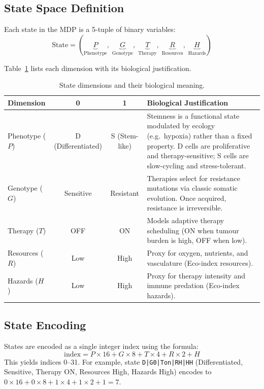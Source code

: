 \documentclass[12pt,a4paper]{article}
\begin{document}
\subsection{State Space Definition}

Each state in the MDP is a 5-tuple of binary variables:
\[
    \text{State} = (\underbrace{P}_{\text{Phenotype}},\; \underbrace{G}_{\text{Genotype}},\; \underbrace{T}_{\text{Therapy}},\; \underbrace{R}_{\text{Resources}},\; \underbrace{H}_{\text{Hazards}})
\]

Table~\ref{tab:state_dims} lists each dimension with its biological justification.

\begin{table}[H]
\centering
\caption{State dimensions and their biological meaning.}
\label{tab:state_dims}
\begin{tabular}{p{2.3cm}ccp{6.5cm}}
\toprule
\textbf{Dimension} & \textbf{0} & \textbf{1} & \textbf{Biological Justification} \\
\midrule
Phenotype ($P$) & D (Differentiated) & S (Stem-like) & Stemness is a functional state modulated by ecology (e.g.\ hypoxia) rather than a fixed property. D cells are proliferative and therapy-sensitive; S cells are slow-cycling and stress-tolerant. \\
\addlinespace
Genotype ($G$) & Sensitive & Resistant & Therapies select for resistance mutations via classic somatic evolution. Once acquired, resistance is irreversible. \\
\addlinespace
Therapy ($T$) & OFF & ON & Models adaptive therapy scheduling (ON when tumour burden is high, OFF when low). \\
\addlinespace
Resources ($R$) & Low & High & Proxy for oxygen, nutrients, and vasculature (Eco-index resources). \\
\addlinespace
Hazards ($H$) & Low & High & Proxy for therapy intensity and immune predation (Eco-index hazards). \\
\bottomrule
\end{tabular}
\end{table}

\subsection{State Encoding}

States are encoded as a single integer index using the formula:
\[
    \text{index} = P \times 16 + G \times 8 + T \times 4 + R \times 2 + H
\]
This yields indices 0--31. For example, state \texttt{D|G0|Ton|RH|HH} (Differentiated, Sensitive, Therapy ON, Resources High, Hazards High) encodes to $0 \times 16 + 0 \times 8 + 1 \times 4 + 1 \times 2 + 1 = 7$.
\end{document}
